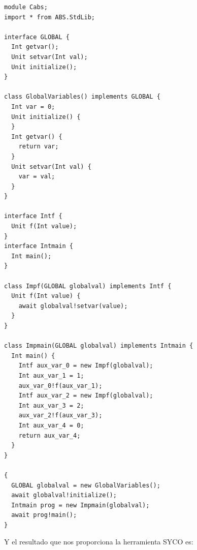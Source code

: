 \begin{lstlisting}
module Cabs;
import * from ABS.StdLib;

interface GLOBAL {
  Int getvar();
  Unit setvar(Int val);
  Unit initialize();
}

class GlobalVariables() implements GLOBAL {
  Int var = 0;
  Unit initialize() {
  }
  Int getvar() {
  	return var;
  }
  Unit setvar(Int val) {
  	var = val;
  }
}

interface Intf {
  Unit f(Int value);
}
interface Intmain {
  Int main();
}

class Impf(GLOBAL globalval) implements Intf {
  Unit f(Int value) {
  	await globalval!setvar(value);
  }
}

class Impmain(GLOBAL globalval) implements Intmain {
  Int main() {
    Intf aux_var_0 = new Impf(globalval);
    Int aux_var_1 = 1;
    aux_var_0!f(aux_var_1);
    Intf aux_var_2 = new Impf(globalval);
    Int aux_var_3 = 2;
    aux_var_2!f(aux_var_3);
    Int aux_var_4 = 0;
    return aux_var_4;
  }
}

{
  GLOBAL globalval = new GlobalVariables();
  await globalval!initialize();
  Intmain prog = new Impmain(globalval);
  await prog!main();
}

\end{lstlisting}
Y el resultado que nos proporciona la herramienta SYCO es:

